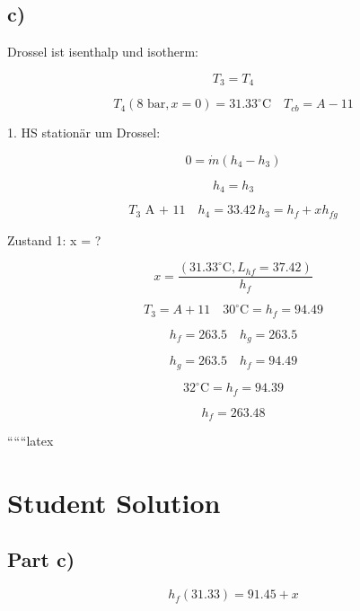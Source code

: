 

\subsection*{c)}

Drossel ist isenthalp und isotherm:

\[
T_3 = T_4
\]

\[
T_4 (8 \text{ bar}, x = 0) = 31.33^\circ \text{C} \quad T_{cb} = A - 11
\]

1. HS stationär um Drossel:

\[
0 = \dot{m} (h_4 - h_3)
\]

\[
h_4 = h_3
\]

\[
T_3 \text{ A + 11} \quad h_4 = 33.42 \, h_3 = h_f + x h_{fg}
\]

Zustand 1: \quad x = ?

\[
x = \frac{(31.33^\circ \text{C}, L_{hf} = 37.42)}{h_f}
\]

\[
T_3 = A + 11 \quad 30^\circ \text{C} = h_f = 94.49
\]

\[
h_f = 263.5 \quad h_g = 263.5
\]

\[
h_g = 263.5 \quad h_f = 94.49
\]

\[
32^\circ \text{C} = h_f = 94.39
\]

\[
h_f = 263.48
\]

``````latex


\section*{Student Solution}

\subsection*{Part c)}

\[
h_f(31.33) = 91.45 + x
\]